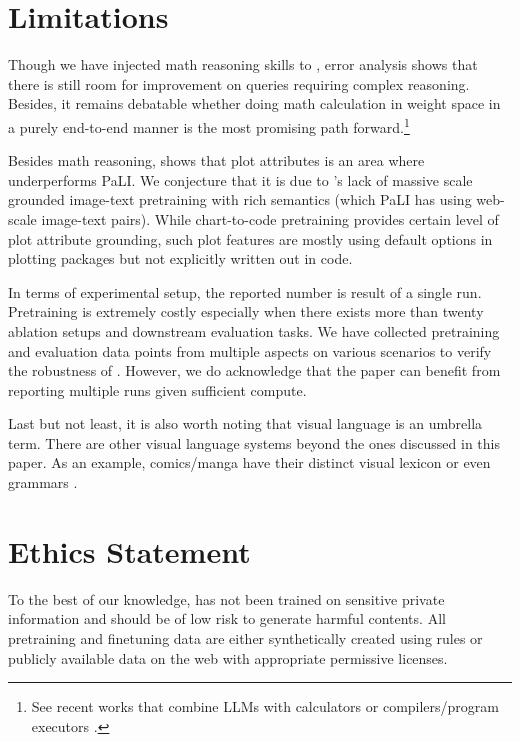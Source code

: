 
\section*{Limitations}\label{sec:limits}
Though we have injected math reasoning skills to \model, error analysis shows that there is still room for improvement on queries requiring complex reasoning. Besides, it remains debatable whether doing math calculation in weight space in a purely end-to-end manner is the most promising path forward.\footnote{See recent works that combine LLMs with calculators \citep{wei2022chain}  or compilers/program executors \citep{cheng2022binding,chen2022program,gao2022pal}.}

Besides math reasoning,  shows that plot attributes is an area where \model{} underperforms PaLI. We conjecture that it is due to \model's lack of massive scale grounded image-text pretraining with rich semantics (which PaLI has using web-scale image-text pairs). While chart-to-code pretraining provides certain level of plot attribute grounding, such plot features are mostly using default options in plotting packages but not explicitly written out in code.


In terms of experimental setup, the reported number is result of a single run. Pretraining is extremely costly especially when there exists more than twenty ablation setups and downstream evaluation tasks. We have collected pretraining and evaluation data points from multiple aspects on various scenarios to verify the robustness of \model. However, we do acknowledge that the paper can benefit from reporting multiple runs given sufficient compute.


Last but not least, it is also worth noting that visual language is an umbrella term. There are other visual language systems beyond the ones discussed in this paper. As an example, comics/manga have their distinct visual lexicon or even grammars \citep{cohn2013visual}.

\section*{Ethics Statement}\label{sec:ethics}
To the best of our knowledge, \model{} has not been trained on sensitive private information and should be of low risk to generate harmful contents. All pretraining and finetuning data are either synthetically created using rules or publicly available data on the web with appropriate permissive licenses.
